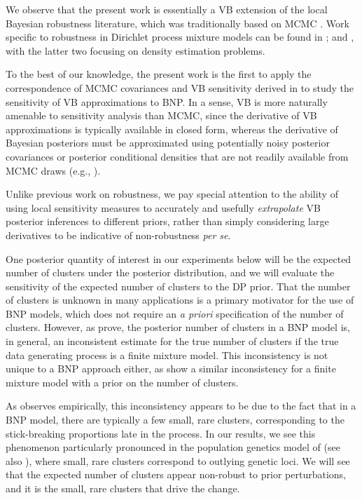 We observe that the present work is essentially a
VB extension of the local Bayesian robustness literature, which was
traditionally based on MCMC
\citep{gustafson:1996:local, basu:1996:local}.
Work specific to robustness in Dirichlet process mixture models can be found in
\citet{Basu:2000:robustnessBNP, barajas:2009:densitysens}; and \citet{saha:2019:geometricsens},
with the latter two focusing on density estimation problems.

To the best of our knowledge, the present work is the first to apply the
correspondence of MCMC covariances and VB sensitivity derived in
\citep{giordano:2018:covariances} to study the sensitivity of VB approximations to BNP.
In a sense, VB is more naturally
amenable to sensitivity analysis than MCMC, since the derivative of VB
approximations is typically available in closed form, whereas the derivative of
Bayesian posteriors must be approximated using potentially noisy posterior
covariances or posterior conditional densities that are not readily
available from MCMC draws (e.g., \citet{gustafson:1996:marginal}).

Unlike previous work on robustness, we pay
special attention to the ability of using local sensitivity measures
to accurately and usefully \textit{extrapolate}
VB posterior inferences to different priors, rather than simply considering
large derivatives to be indicative of non-robustness \textit{per se}.

One posterior quantity of interest in our experiments below will be
the expected number of clusters under the posterior distribution,
and we will evaluate the sensitivity of the expected number of clusters
to the DP prior.
That the number of clusters is unknown in many applications
is a primary motivator for the use of BNP models, which does not
require an \textit{a priori} specification of the number of clusters.
However, as \citet{miller:2013:neurips, miller:14:inconsistency} prove,
the posterior number of clusters in a BNP model is,
in general, an inconsistent estimate for the true number of clusters if the
true data generating process is a finite mixture model.
This inconsistency is not unique to a BNP approach either, as
\citet{cai:2020:finite, cai:2020:power} show
a similar inconsistency for a finite mixture model with a prior on the number
of clusters.

As \citet{miller:14:inconsistency} observes empirically,
this inconsistency appears to be due to the fact
that in a BNP model, there are typically a few small, rare clusters,
corresponding to the stick-breaking proportions late in the process.
In our results, we see this phenomenon particularly pronounced in
the population genetics model of 
(see also ),
where small, rare clusters correspond to outlying genetic loci.
We will see that the expected number of clusters appear non-robust to prior
perturbations, and it is the small, rare clusters that drive
the change.


